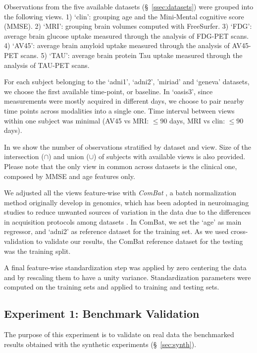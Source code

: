 Observations from the five available datasets (\S~\ref{ssec:datasets}) were grouped into the following views.
1) `clin': grouping age and the Mini-Mental cognitive score (MMSE).
2) `MRI': grouping brain volumes computed with FreeSurfer.
3) `FDG': average brain glucose uptake measured through the analysis of FDG-PET scans.
4) `AV45': average brain amyloid uptake measured through the analysis of AV45-PET scans.
5) `TAU': average brain protein Tau uptake measured through the analysis of TAU-PET scans.

For each subject belonging to the `adni1', `adni2', 'miriad' and `geneva' datasets, we choose the first available time-point, or baseline.
In `oasis3', since measurements were mostly acquired in different days, we choose to pair nearby time points across modalities into a single one.
Time interval between views within one subject was minimal (AV45 vs MRI: $\leq 90$ days, MRI vs clin: $\leq 90$ days).

In  we show the number of observations stratified by dataset and view.
Size of the intersection ($\cap$) and union ($\cup$) of subjects with available views is also provided.
Please note that the only view in common across datasets is the clinical one, composed by MMSE and age features only.

We adjusted all the views feature-wise with \textit{ComBat} \citep{combat}, a batch normalization method originally develop in genomics, which has been adopted in neuroimaging studies to reduce unwanted sources of variation in the data due to the differences in acquisition protocols among datasets \citep{Fortin2017, Fortin2018, Orlhac2020}.
In ComBat, we set the `age' as main regressor, and `adni2' as reference dataset for the training set.
As we used cross-validation to validate our results, the ComBat reference dataset for the testing was the training split.

A final feature-wise standardization step was applied by zero centering the data and by rescaling them to have a unity variance.
Standardization parameters were computed on the training sets and applied to training and testing sets.

\subsection{Experiment 1: Benchmark Validation}


The purpose of this experiment is to validate on real data the benchmarked results obtained with the synthetic experiments (\S~\ref{sec:synth}).

